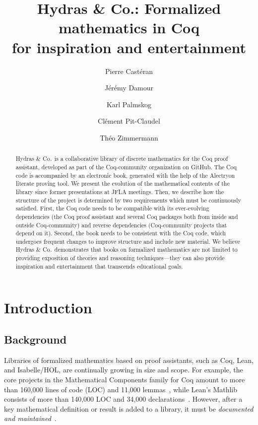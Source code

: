 \documentclass{easychair}
\title{Hydras \& Co.: Formalized mathematics in Coq\\
 for inspiration and entertainment
}
\author{
Pierre Castéran \inst{1}
\and
    Jérémy Damour \inst{2}
\and
Karl Palmskog \inst{3}
\and Clément Pit-Claudel \inst{4}
\and Théo Zimmermann \inst{5}
}
\institute{
Univ. Bordeaux, CNRS, Bordeaux INP, LaBRI, UMR 5800, F-33400 Talence, France  %
\and
Univ. de Paris, F-75013 Paris, France
\and
KTH Royal Institute of Technology, Stockholm, Sweden
\and
MIT CSAIL, Cambridge, Massachusetts, USA
\and
Inria, Univ. de Paris, CNRS, IRIF, UMR 8243, F-75013 Paris, France
}
\newcommand{\coq}{Coq\xspace}
\newcommand{\community}{Coq-community\xspace}
\newcommand{\alectr}{Alectryon\xspace}
\newcommand{\Hydras}{Hydras \& Co$\text.$\xspace}
\begin{document}
\maketitle


\begin{abstract}
  \Hydras is a collaborative library of discrete mathematics for the
  \coq proof assistant, developed as part of the \community organization
  on GitHub. The Coq code is accompanied
  by an electronic book, generated with the help of the \alectr
  literate proving tool. We present the evolution of the mathematical
  contents of the library since former presentations at JFLA meetings.
  Then, we describe how the structure of the project is determined
  by two requirements which must be continuously satisfied.
  First, the Coq code needs to be compatible with its ever-evolving
  dependencies (the Coq proof assistant and several Coq packages both from
  inside and outside \community) and reverse dependencies (\community
  projects that depend on it). Second, the book needs to be consistent
  with the Coq code, which undergoes frequent changes to improve
  structure and include new material. We believe \Hydras demonstrates
  that books on formalized mathematics are not limited to
  providing exposition of theories and reasoning techniques---they
  can also provide inspiration and entertainment that transcends educational goals.
\end{abstract}




\section{Introduction}
\label{sect:introduction}

\subsection{Background}

Libraries of formalized mathematics based on proof assistants, such as \coq, Lean, and Isabelle/HOL, are continually growing in size and scope.
For example, the core projects in the Mathematical Components family for Coq amount to more than 160,000 lines of code (LOC) and 11,000 lemmas~\cite{Nie2020a}, while Lean's Mathlib consists of more than 140,000 LOC and 34,000 declarations~\cite{Mathlib}. However, after a key mathematical definition or result is added to a library, it must be \emph{documented and maintained}~\cite{vanDoorn2020,alectryonpaper}.
\end{document}
